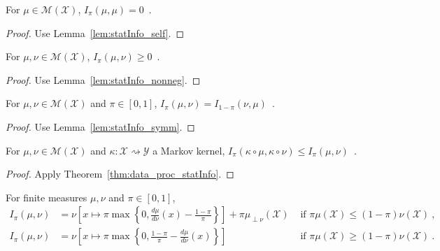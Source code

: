 \begin{lemma}
  \label{lem:deGrootInfo_self}
  For $\mu \in \mathcal M(\mathcal X)$, $I_\pi(\mu, \mu) = 0$~.
\end{lemma}

\begin{proof}%
{}
Use Lemma~\ref{lem:statInfo_self}.
\end{proof}

\begin{lemma}
  \label{lem:deGrootInfo_nonneg}
  For $\mu, \nu \in \mathcal M(\mathcal X)$, $I_\pi(\mu, \nu) \ge 0$~.
\end{lemma}

\begin{proof}%
{}
Use Lemma~\ref{lem:statInfo_nonneg}.
\end{proof}

\begin{lemma}
  \label{lem:deGrootInfo_symm}
  For $\mu, \nu \in \mathcal M(\mathcal X)$ and $\pi \in [0,1]$, $I_\pi(\mu, \nu) = I_{1 - \pi}(\nu, \mu)$~.
\end{lemma}

\begin{proof}%
{}
Use Lemma~\ref{lem:statInfo_symm}.
\end{proof}

\begin{theorem}
  \label{thm:data_proc_deGrootInfo}
  \leanok
  For $\mu, \nu \in \mathcal M(\mathcal X)$ and $\kappa : \mathcal X \rightsquigarrow \mathcal Y$ a Markov kernel, $I_\pi(\kappa \circ \mu, \kappa \circ \nu) \le I_\pi(\mu, \nu)$~.
\end{theorem}

\begin{proof}\leanok
{}
Apply Theorem~\ref{thm:data_proc_statInfo}.
\end{proof}


\begin{lemma}
  \label{lem:deGrootInfo_eq_integral}
  For finite measures $\mu, \nu$ and $\pi \in [0,1]$,
  \begin{align*}
  I_\pi(\mu, \nu)
  &= \nu\left[ x \mapsto \pi \max \left\{0 , \frac{d \mu}{d\nu}(x) - \frac{1 - \pi}{\pi} \right\} \right] + \pi \mu_{\perp \nu}(\mathcal X) & \text{ if } \pi \mu(\mathcal X) \le (1 - \pi) \nu(\mathcal X)
  \: , \\
  I_\pi(\mu, \nu)
  &= \nu\left[ x \mapsto \pi \max \left\{0 , \frac{1 - \pi}{\pi} - \frac{d \mu}{d\nu}(x) \right\} \right] & \text{ if } \pi \mu(\mathcal X) \ge (1 - \pi) \nu(\mathcal X)
  \: .
  \end{align*}
\end{lemma}

